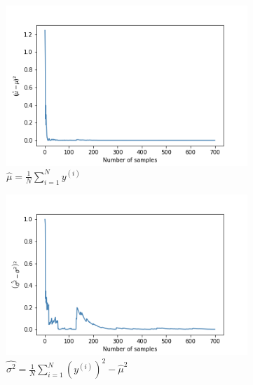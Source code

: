 \documentclass[a4paper]{article}
\begin{document}
\begin{figure}[h]
    \centering
    \begin{subfigure}[b]{0.3\textwidth}
        \centering
        \includegraphics[width=\textwidth]{figures/monte_carlo_mean.png}
        \caption{$\hat{\mu} = \frac{1}{N} \sum_{i=1}^{N} y^{(i)}$}
        \label{fig:monte_carlo_mean}
    \end{subfigure}
    \hfill
    \begin{subfigure}[b]{0.3\textwidth}
        \centering
        \includegraphics[width=\textwidth]{figures/monte_carlo_variance.png}
        \caption{$\hat{\sigma^2} = \frac{1}{N} \sum_{i=1}^N \left(y^{(i)}\right)^2 - \hat{\mu}^2$}
        \label{fig:monte_carlo_variance}
    \end{subfigure}
    \hfill
    \begin{subfigure}[b]{0.3\textwidth}
        \centering

\end{subfigure}
\end{figure}
\end{document}
